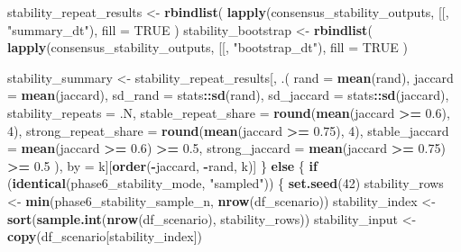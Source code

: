 \documentclass[
]{article}
\newenvironment{Shaded}{\begin{snugshade}}{\end{snugshade}}
\newcommand{\AttributeTok}[1]{\textcolor[rgb]{0.13,0.29,0.53}{#1}}
\newcommand{\ConstantTok}[1]{\textcolor[rgb]{0.56,0.35,0.01}{#1}}
\newcommand{\ControlFlowTok}[1]{\textcolor[rgb]{0.13,0.29,0.53}{\textbf{#1}}}
\newcommand{\DecValTok}[1]{\textcolor[rgb]{0.00,0.00,0.81}{#1}}
\newcommand{\FloatTok}[1]{\textcolor[rgb]{0.00,0.00,0.81}{#1}}
\newcommand{\FunctionTok}[1]{\textcolor[rgb]{0.13,0.29,0.53}{\textbf{#1}}}
\newcommand{\NormalTok}[1]{#1}
\newcommand{\OtherTok}[1]{\textcolor[rgb]{0.56,0.35,0.01}{#1}}
\newcommand{\SpecialCharTok}[1]{\textcolor[rgb]{0.81,0.36,0.00}{\textbf{#1}}}
\newcommand{\StringTok}[1]{\textcolor[rgb]{0.31,0.60,0.02}{#1}}
\begin{document}
\begin{Shaded}
\begin{Highlighting}[]
\NormalTok{  stability\_repeat\_results }\OtherTok{\textless{}{-}} \FunctionTok{rbindlist}\NormalTok{(}
    \FunctionTok{lapply}\NormalTok{(consensus\_stability\_outputs, }\StringTok{\textasciigrave{}}\AttributeTok{[[}\StringTok{\textasciigrave{}}\NormalTok{, }\StringTok{"summary\_dt"}\NormalTok{),}
    \AttributeTok{fill =} \ConstantTok{TRUE}
\NormalTok{  )}
\NormalTok{  stability\_bootstrap }\OtherTok{\textless{}{-}} \FunctionTok{rbindlist}\NormalTok{(}
    \FunctionTok{lapply}\NormalTok{(consensus\_stability\_outputs, }\StringTok{\textasciigrave{}}\AttributeTok{[[}\StringTok{\textasciigrave{}}\NormalTok{, }\StringTok{"bootstrap\_dt"}\NormalTok{),}
    \AttributeTok{fill =} \ConstantTok{TRUE}
\NormalTok{  )}

\NormalTok{  stability\_summary }\OtherTok{\textless{}{-}}\NormalTok{ stability\_repeat\_results[, .(}
    \AttributeTok{rand =} \FunctionTok{mean}\NormalTok{(rand),}
    \AttributeTok{jaccard =} \FunctionTok{mean}\NormalTok{(jaccard),}
    \AttributeTok{sd\_rand =}\NormalTok{ stats}\SpecialCharTok{::}\FunctionTok{sd}\NormalTok{(rand),}
    \AttributeTok{sd\_jaccard =}\NormalTok{ stats}\SpecialCharTok{::}\FunctionTok{sd}\NormalTok{(jaccard),}
    \AttributeTok{stability\_repeats =}\NormalTok{ .N,}
    \AttributeTok{stable\_repeat\_share =} \FunctionTok{round}\NormalTok{(}\FunctionTok{mean}\NormalTok{(jaccard }\SpecialCharTok{\textgreater{}=} \FloatTok{0.6}\NormalTok{), }\DecValTok{4}\NormalTok{),}
    \AttributeTok{strong\_repeat\_share =} \FunctionTok{round}\NormalTok{(}\FunctionTok{mean}\NormalTok{(jaccard }\SpecialCharTok{\textgreater{}=} \FloatTok{0.75}\NormalTok{), }\DecValTok{4}\NormalTok{),}
    \AttributeTok{stable\_jaccard =} \FunctionTok{mean}\NormalTok{(jaccard }\SpecialCharTok{\textgreater{}=} \FloatTok{0.6}\NormalTok{) }\SpecialCharTok{\textgreater{}=} \FloatTok{0.5}\NormalTok{,}
    \AttributeTok{strong\_jaccard =} \FunctionTok{mean}\NormalTok{(jaccard }\SpecialCharTok{\textgreater{}=} \FloatTok{0.75}\NormalTok{) }\SpecialCharTok{\textgreater{}=} \FloatTok{0.5}
\NormalTok{  ), by }\OtherTok{=}\NormalTok{ k][}\FunctionTok{order}\NormalTok{(}\SpecialCharTok{{-}}\NormalTok{jaccard, }\SpecialCharTok{{-}}\NormalTok{rand, k)]}
\NormalTok{\} }\ControlFlowTok{else}\NormalTok{ \{}
  \ControlFlowTok{if}\NormalTok{ (}\FunctionTok{identical}\NormalTok{(phase6\_stability\_mode, }\StringTok{"sampled"}\NormalTok{)) \{}
    \FunctionTok{set.seed}\NormalTok{(}\DecValTok{42}\NormalTok{)}
\NormalTok{    stability\_rows }\OtherTok{\textless{}{-}} \FunctionTok{min}\NormalTok{(phase6\_stability\_sample\_n, }\FunctionTok{nrow}\NormalTok{(df\_scenario))}
\NormalTok{    stability\_index }\OtherTok{\textless{}{-}} \FunctionTok{sort}\NormalTok{(}\FunctionTok{sample.int}\NormalTok{(}\FunctionTok{nrow}\NormalTok{(df\_scenario), stability\_rows))}
\NormalTok{    stability\_input }\OtherTok{\textless{}{-}} \FunctionTok{copy}\NormalTok{(df\_scenario[stability\_index])}


\end{Highlighting}
\end{Shaded}
\end{document}
